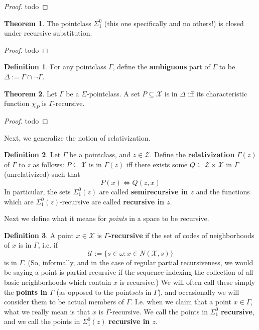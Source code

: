\documentclass{article}
\theoremstyle{definition}
\newtheorem{definition}{Definition}[section]
\newtheorem{theorem}{Theorem}[section]
\theoremstyle{plain}
\begin{document}
\begin{proof}
    todo
\end{proof}
\begin{theorem}
    The pointclass $\Sigma_1^0$ (this one specifically and no others!) is closed under recursive substitution.
\end{theorem}
\begin{proof}
    todo
\end{proof}
\begin{definition}
    For any pointclass $\Gamma$, define the \textbf{ambiguous} part of $\Gamma$ to be $\Delta := \Gamma \cap \neg \Gamma$.
\end{definition}
\begin{theorem}
    Let $\Gamma$ be a $\Sigma$-pointclass. A set $P \subseteq \mathcal{X}$ is in $\Delta$ iff its characteristic function $\chi_P$ is $\Gamma$-recursive.  
\end{theorem}
\begin{proof}
    todo
\end{proof}
Next, we generalize the notion of relativization. 
\begin{definition}
    Let $\Gamma$ be a pointclass, and $z \in \mathcal{Z}$. Define the \textbf{relativization} $\Gamma(z)$ of $\Gamma$ to $z$ as follows: $P \subseteq \mathcal{X}$ is in $\Gamma(z)$ iff there exists some $Q \subseteq \mathcal{Z} \times \mathcal{X}$ in $\Gamma$ (unrelativized) such that 
    \[ P(x) \iff Q(z,x) \]
    In particular, the sets $\Sigma^0_1(z)$ are called \textbf{semirecursive in $z$} and the functions which are $\Sigma^0_1(z)$-recursive are called \textbf{recursive in $z$}.
\end{definition}
Next we define what it means for \textit{points} in a space to be recursive.
\begin{definition}
    A point $x \in \mathcal{X}$ is \textbf{$\Gamma$-recursive} if the set of codes of neighborhoods of $x$ is in $\Gamma$, i.e. if 
    \[ \mathcal{U} := \{s \in \omega: x \in N(\mathcal{X},s)\} \]
    is in $\Gamma$. (So, informally, and in the case of regular partial recursiveness, we would be saying a point is partial recursive if the sequence indexing the collection of all basic neighborhoods which contain $x$ is recursive.) We will often call these simply the \textbf{points in $\Gamma$} (as opposed to the point\textit{sets} in $\Gamma$), and occasionally we will consider them to be actual members of $\Gamma$. I.e. when we claim that a point $x \in \Gamma$, what we really mean is that $x$ is $\Gamma$-recursive. We call the points in $\Sigma^0_1$ \textbf{recursive}, and we call the points in $\Sigma^0_1(z)$ \textbf{recursive in $z$}. 
\end{definition}
\end{document}
